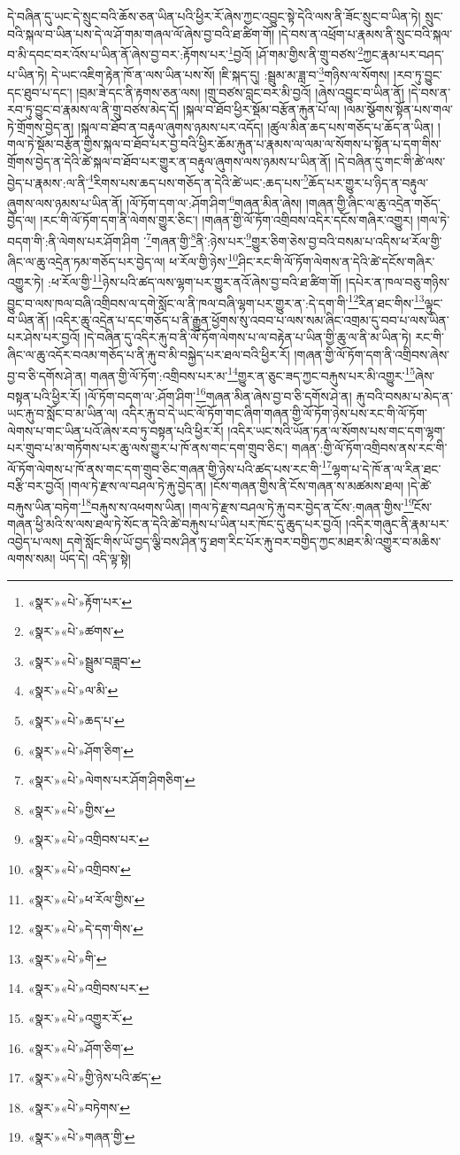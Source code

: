 དེ་བཞིན་དུ་ཡང་དེ་སྲུང་བའི་ཆོས་ཅན་ཡིན་པའི་ཕྱིར་རོ་ཞེས་ཀྱང་འབྱུང་སྟེ་དེའི་ལས་ནི་ཟོང་སྲུང་བ་ཡིན་ཏེ། སྲུང་བའི་སྐལ་བ་ཡིན་པས་དེ་ལ་ཤོ་གམ་གཞལ་ལོ་ཞེས་བྱ་བའི་ཐ་ཚིག་གོ། །དེ་བས་ན་འཕྲོག་པ་རྣམས་ནི་སྲུང་བའི་སྐལ་བ་མི་དབང་བར་འོས་པ་ཡིན་ནོ་ཞེས་བྱ་བར་:རྟོགས་པར་\footnote{«སྣར་»«པེ་»རྟོག་པར་}བྱའོ། །ཤོ་གམ་གྱིས་ནི་གྲུ་བཙས་\footnote{«སྣར་»«པེ་»ཚགས་}ཀྱང་རྣམ་པར་བཤད་པ་ཡིན་ཏེ། དེ་ཡང་འཇིག་རྟེན་ཁོ་ན་ལས་ཡིན་པས་སོ། །ཇི་སྐད་དུ། :སྦྲུམ་མ་ཟླ་བ་\footnote{«སྣར་»«པེ་»སྦྲུམ་བཟླབ་}གཉིས་ལ་སོགས། །རབ་ཏུ་བྱུང་དང་ཐུབ་པ་དང་། །བྲམ་ཟེ་དང་ནི་རྟགས་ཅན་ལས། །གྲུ་བཙས་བླང་བར་མི་བྱའོ། །ཞེས་འབྱུང་བ་ཡིན་ནོ། །དེ་བས་ན་རབ་ཏུ་བྱུང་བ་རྣམས་ལ་ནི་གྲུ་བཙས་མེད་དོ། །སྐལ་བ་ཐོབ་ཕྱིར་སྡོམ་བརྩོན་རྐུན་པོ་ལ། །ལམ་སྩོགས་སྟོན་པས་གལ་ཏེ་གྲོགས་བྱེད་ན། །སྐལ་བ་ཐོབ་ན་བརྟུལ་ཞུགས་ཉམས་པར་འདོད། །ཚུལ་མིན་ཆད་པས་གཅོད་པ་ཆོད་ན་ཡིན། །གལ་ཏེ་སྡོམ་བརྩོན་གྱིས་སྐལ་བ་ཐོབ་པར་བྱ་བའི་ཕྱིར་ཆོམ་རྐུན་པ་རྣམས་ལ་ལམ་ལ་སོགས་པ་སྟོན་པ་དག་གིས་གྲོགས་བྱེད་ན་དེའི་ཚེ་སྐལ་བ་ཐོབ་པར་གྱུར་ན་བརྟུལ་ཞུགས་ལས་ཉམས་པ་ཡིན་ནོ། །དེ་བཞིན་དུ་གང་གི་ཚེ་ལས་བྱེད་པ་རྣམས་:ལ་ནི་\footnote{«སྣར་»«པེ་»ལ་མི་}རིགས་པས་ཆད་པས་གཅོད་ན་དེའི་ཚེ་ཡང་:ཆད་པས་\footnote{«སྣར་»«པེ་»ཆད་པ་}ཆོད་པར་གྱུར་པ་ཉིད་ན་བརྟུལ་ཞུགས་ལས་ཉམས་པ་ཡིན་ནོ། །ལོ་ཏོག་དག་ལ་:ཤོག་ཤིག་\footnote{«སྣར་»«པེ་»ཤོག་ཅིག་}གཞན་མིན་ཞེས། །གཞན་གྱི་ཞིང་ལ་ཆུ་འདྲེན་གཅོད་བྱེད་ལ། །རང་གི་ལོ་ཏོག་དག་ནི་ལེགས་གྱུར་ཅིང་། །གཞན་གྱི་ལོ་ཏོག་འགྲིབས་འདིར་དངོས་གཞིར་འགྱུར། །གལ་ཏེ་བདག་གི་:ནི་ལེགས་པར་ཤོག་ཤིག ་\footnote{«སྣར་»«པེ་»ལེགས་པར་ཤོག་ཤིགཅིག་}གཞན་གྱི་\footnote{«སྣར་»«པེ་»གྱིས་}ནི་:ཉེས་པར་\footnote{«སྣར་»«པེ་»འགྲིབས་པར་}གྱུར་ཅིག་ཅེས་བྱ་བའི་བསམ་པ་འདིས་ཕ་རོལ་གྱི་ཞིང་ལ་ཆུ་འདྲེན་ཏམ་གཅོད་པར་བྱེད་ལ། ཕ་རོལ་གྱི་ཉེས་\footnote{«སྣར་»«པེ་»འགྲིབས་}ཤིང་རང་གི་ལོ་ཏོག་ལེགས་ན་དེའི་ཚེ་དངོས་གཞིར་འགྱུར་ཏེ། :ཕ་རོལ་གྱི་\footnote{«སྣར་»«པེ་»ཕ་རོལ་གྱིས་}ཉེས་པའི་ཚད་ལས་ལྷག་པར་གྱུར་ནའོ་ཞེས་བྱ་བའི་ཐ་ཚིག་གོ། །དཔེར་ན་ཁལ་བཅུ་གཉིས་བྱུང་བ་ལས་ཁལ་བཞི་འགྲིབས་ལ་དགེ་སློང་ལ་ནི་ཁལ་བཞི་ལྷག་པར་གྱུར་ན་:དེ་དག་གི་\footnote{«སྣར་»«པེ་»དེ་དག་གིས་}རིན་ཐང་གིས་\footnote{«སྣར་»«པེ་»གི་}ལྟུང་བ་ཡིན་ནོ། །འདིར་ཆུ་འདྲེན་པ་དང་གཅོད་པ་ནི་རྒྱུན་ཕྱོགས་སུ་འབབ་པ་ལས་སམ་ཞིང་འགྲམ་དུ་བབ་པ་ལས་ཡིན་པར་ཤེས་པར་བྱའོ། །དེ་བཞིན་དུ་འདིར་རྐུ་བ་ནི་ལོ་ཏོག་ལེགས་པ་ལ་བརྟེན་པ་ཡིན་གྱི་ཆུ་ལ་ནི་མ་ཡིན་ཏེ། རང་གི་ཞིང་ལ་ཆུ་འདོར་བའམ་གཅོད་པ་ནི་རྐུ་བ་མི་བསྐྱེད་པར་ཐལ་བའི་ཕྱིར་རོ། །གཞན་གྱི་ལོ་ཏོག་དག་ནི་འགྲིབས་ཞེས་བྱ་བ་ཅི་དགོས་ཤེ་ན། གཞན་གྱི་ལོ་ཏོག་:འགྲིབས་པར་མ་\footnote{«སྣར་»«པེ་»འགྲིབས་པར་}གྱུར་ན་ཅུང་ཟད་ཀྱང་བརྐུས་པར་མི་འགྱུར་\footnote{«སྣར་»«པེ་»འགྱུར་རོ་}ཞེས་བསྟན་པའི་ཕྱིར་རོ། །ལོ་ཏོག་བདག་ལ་:ཤོག་ཤིག་\footnote{«སྣར་»«པེ་»ཤོག་ཅིག་}གཞན་མིན་ཞེས་བྱ་བ་ཅི་དགོས་ཤེ་ན། རྐུ་བའི་བསམ་པ་མེད་ན་ཡང་རྐུ་བ་སློང་བ་མ་ཡིན་ལ། འདིར་རྐུ་བ་དེ་ཡང་ལོ་ཏོག་གང་ཞིག་གཞན་གྱི་ལོ་ཏོག་ཉེས་པས་རང་གི་ལོ་ཏོག་ལེགས་པ་གང་ཡིན་པའོ་ཞེས་རབ་ཏུ་བསྟན་པའི་ཕྱིར་རོ། །འདིར་ཡང་སའི་ཡོན་ཏན་ལ་སོགས་པས་གང་དག་ལྷག་པར་གྲུབ་པ་མ་གཏོགས་པར་ཆུ་ལས་གྱུར་པ་ཁོ་ནས་གང་དག་གྲུབ་ཅིང་། གཞན་:གྱི་ལོ་ཏོག་འགྲིབས་ནས་རང་གི་ལོ་ཏོག་ལེགས་པ་ཁོ་ནས་གང་དག་གྲུབ་ཅིང་གཞན་གྱི་ཉེས་པའི་ཚད་པས་རང་གི་\footnote{«སྣར་»«པེ་»གྱི་ཉེས་པའི་ཚད་}ལྷག་པ་དེ་ཁོ་ན་ལ་རིན་ཐང་བརྩི་བར་བྱའོ། །གལ་ཏེ་རྫས་ལ་བཤལ་ཏེ་རྐུ་བྱེད་ན། །ངོས་གཞན་གྱིས་ནི་ངོས་གཞན་ས་མཚམས་ཐལ། །དེ་ཚེ་བརྐུས་ཡིན་བཏེག་\footnote{«སྣར་»«པེ་»བཏེགས་}བརྐུས་ས་འཕགས་ཡིན། །གལ་ཏེ་རྫས་བཤལ་ཏེ་རྐུ་བར་བྱེད་ན་ངོས་:གཞན་གྱིས་\footnote{«སྣར་»«པེ་»གཞན་གྱི་}ངོས་གཞན་ཕྱི་མའི་ས་ལས་ཐལ་ཏེ་སོང་ན་དེའི་ཚེ་བརྐུས་པ་ཡིན་པར་ཁོང་དུ་ཆུད་པར་བྱའོ། །འདིར་གཞུང་ནི་རྣམ་པར་འབྱེད་པ་ལས། དགེ་སློང་གིས་ཡོ་བྱད་ལྕི་བས་ཤིན་ཏུ་ཐག་རིང་པོར་རྐུ་བར་བགྱིད་ཀྱང་མཐར་མི་འགྱུར་བ་མཆིས་ལགས་སམ། ཡོད་དེ། འདི་ལྟ་སྟེ། 